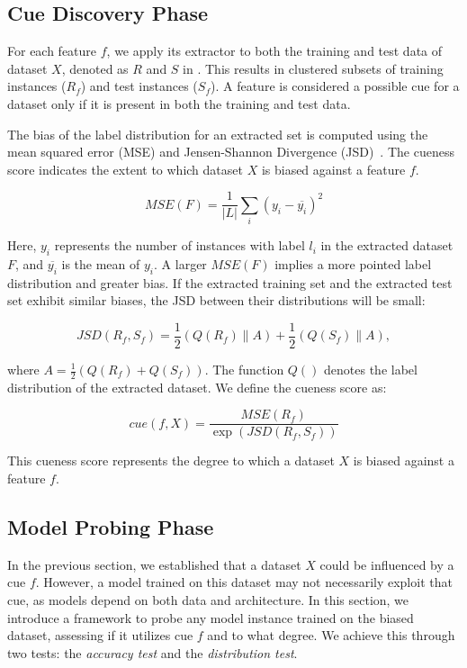 \subsection{Cue Discovery Phase}
\label{sec:cuenessdiscovery}

For each feature $f$, we apply its extractor to both the 
training and test data of dataset $X$, 
denoted as $R$ and $S$ in . 
This results in clustered subsets of training 
instances ($R_f$) and test instances ($S_f$). 
A feature is considered a possible cue for a 
dataset only if it is present in both the training and test data.

The bias of the label distribution for an extracted set 
is computed using the mean squared error (MSE) 
and Jensen-Shannon Divergence (JSD)~\cite{lin1991divergence}. 
The cueness score indicates the extent 
to which dataset $X$ is biased against a feature $f$.

\begin{equation}
MSE(F) = \frac{1}{|L|} \sum_i (y_i - \overline{y_i})^2
\end{equation}

Here, $y_i$ represents the number of instances with label $l_i$ in the extracted dataset $F$, and $\overline{y_i}$ is the mean of $y_i$. A larger $MSE(F)$ implies a more pointed label distribution and greater bias. If the extracted training set and the extracted test set exhibit similar biases, 
the JSD between their distributions will be small:

\begin{equation}
JSD(R_f, S_f) = \frac{1}{2}\left (Q(R_f)\parallel A  \right )+\frac{1}{2}\left (Q(S_f)\parallel A  \right ), 
\end{equation}

where $ A = \frac{1}{2}\left (Q(R_f)+Q(S_f) \right )$. 
The function $Q()$ denotes the label distribution of the extracted dataset. We define the cueness score as:

\begin{equation}
cue(f, X) = \frac{MSE(R_f)}{\exp(JSD(R_f, S_f))}
\end{equation} 

This cueness score represents the degree to which a dataset $X$ is biased against a feature $f$.

\subsection{Model Probing Phase}
\label{sec:modelprobing}
In the previous section, we established that a dataset $X$ could be influenced by a cue $f$. However, a model trained on this dataset may not necessarily exploit that cue, as models depend on both data and architecture. In this section, we introduce a framework to probe any model instance trained on the biased dataset, assessing if it utilizes cue $f$ and to what degree. We achieve this through two tests: the \emph{accuracy test} and the \emph{distribution test}.

